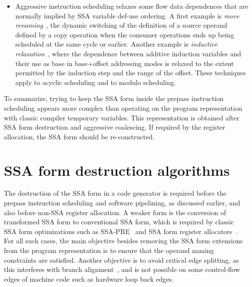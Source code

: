 \begin{itemize}
\item Aggressive instruction scheduling relaxes some flow data dependences that
are normally implied by SSA variable def-use ordering. A first example is
\emph{move renaming}~\cite{Young:1998:MICRO}, the dynamic switching of the
definition of a source operand defined by a copy operation when the consumer
operations ends up being scheduled at the same cycle or earlier. Another example
is \emph{inductive relaxation}~\cite{Dinechin:1997:PaCT}, where the dependence
between additive induction variables and their use as base in base+offset
addressing modes is relaxed to the extent permitted by the induction step and
the range of the offset. These techniques apply to acyclic scheduling and to
modulo scheduling.

\end{itemize}

To summarize, trying to keep the SSA form inside the prepass instruction scheduling
appears more complex than operating on the program representation with classic
compiler temporary variables. This representation is obtained after SSA form
destruction and aggressive coalescing. If required by the register allocation,
the SSA form should be re-constructed.


\section{SSA form destruction algorithms} \label{sec:ssa-destruction}


The destruction of the SSA form in a code generator is required before the
prepass instruction scheduling and software pipelining, as discussed earlier,
and also before non-SSA register allocation.  A weaker form is the conversion of
transformed SSA form to conventional SSA form, which is required by classic SSA
form optimizations such as SSA-PRE~\cite{Kennedy:1999:TOPLAS} and SSA form
register allocators~\cite{Pereira:2008:PLDI}. For all such cases, the main
objective besides removing the SSA form extensions from the program
representation is to ensure that the operand naming constraints are satisfied.
Another objective is to avoid critical edge splitting, as this interferes with
branch alignment~\cite{Calder:1994:ASPLOS}, and is not possible on some
control-flow edges of machine code such as hardware loop back edges.


